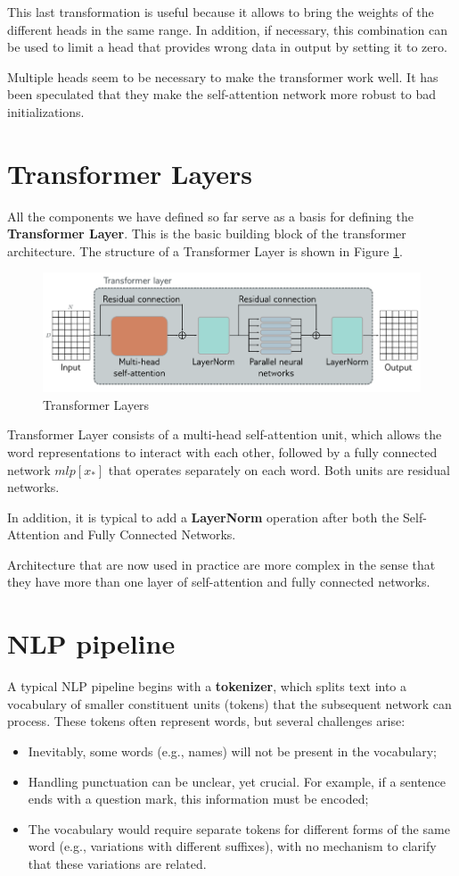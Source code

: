 This last transformation is useful because it allows to bring the weights of the
different heads in the same range. In addition, if necessary, this combination
can be used to limit a head that provides wrong data in output by setting it to
zero.

Multiple heads seem to be necessary to make the transformer work well. It has
been speculated that they make the self-attention network more robust to bad
initializations.

\section{Transformer Layers}
All the components we have defined so far serve as a basis for defining the
\textbf{Transformer Layer}. This is the basic building block of the transformer
architecture. The structure of a Transformer Layer is shown in Figure \ref{fig:transformerLayers}.

\begin{figure}[!ht]
    \centering
    \includegraphics[width=0.5\linewidth]{img/transformer/transformerlayers.png}
    \caption{Transformer Layers}
    \label{fig:transformerLayers}
\end{figure}

Transformer Layer consists of a multi-head self-attention unit, which allows the
word representations to interact with each other, followed by a fully connected
network $mlp[x_\ast]$ that operates separately on each word. Both units are
residual networks.

In addition, it is typical to add a \textbf{LayerNorm} operation after both the
Self-Attention and Fully Connected Networks.

Architecture that are now used in practice are more complex in the sense that
they have more than one layer of self-attention and fully connected networks.

\section{NLP pipeline}
A typical NLP pipeline begins with a \textbf{tokenizer}, which splits text into
a vocabulary of smaller constituent units (tokens) that the subsequent network
can process. These tokens often represent words, but several challenges arise:
\begin{itemize}
    \item Inevitably, some words (e.g., names) will not be present in the vocabulary;
    \item Handling punctuation can be unclear, yet crucial. For example, if a
          sentence ends with a question mark, this information must be encoded;
    \item The vocabulary would require separate tokens for different forms of the
          same word (e.g., variations with different suffixes), with no mechanism
          to clarify that these variations are related.
\end{itemize}

